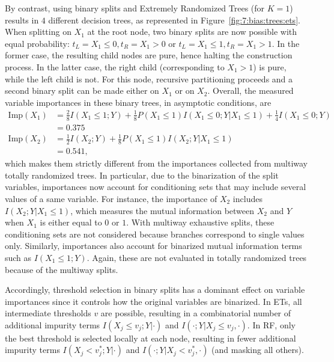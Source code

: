 By contrast, using binary splits and Extremely Randomized Trees (for $K=1$) results in $4$ different decision trees, as
represented in Figure~\ref{fig:7:bias:trees:ets}. When splitting on $X_1$ at
the root node, two binary splits are now possible with equal probability: $t_L = X_1 \leq 0, t_R = X_1 > 0$ or
$t_L = X_1 \leq 1, t_R = X_1 > 1$. In the former case, the resulting child nodes are pure,
hence halting the construction process. In the latter case, the right child
(corresponding to $X_1 > 1$) is pure, while the left child is not. For this
node, recursive partitioning proceeds and a second binary split can be made either on
$X_1$ or on $X_2$.  Overall, the measured variable
importances in these binary trees, in asymptotic conditions, are
\begin{align*}
\text{Imp}(X_1) &= \frac{2}{8} I(X_1 \leq 1;Y) + \frac{1}{8} P(X_1 \leq 1) I(X_1 \leq 0;Y|X_1 \leq 1) + \frac{1}{4} I(X_1 \leq 0;Y)\\
                &= 0.375 \\
\text{Imp}(X_2) &= \frac{1}{2} I(X_2;Y) + \frac{1}{8} P(X_1 \leq 1) I(X_2;Y|X_1\leq 1)\\
                &= 0.541,
\end{align*}
which makes them strictly different from the importances collected from multiway totally
randomized trees. In particular, due to the binarization of the split
variables, importances now account for conditioning sets that may include
several values of a same variable. For instance, the importance of $X_2$
includes $I(X_2;Y|X_1\leq 1)$, which measures the mutual information between
$X_2$ and $Y$ when $X_1$ is either equal to $0$ or $1$. With multiway
exhaustive splits, these conditioning sets are not considered because branches
correspond to single values only. Similarly, importances also account for
binarized mutual information terms such as $I(X_1 \leq 1;Y)$. Again, these are
not evaluated in totally randomized trees because of the multiway splits.

Accordingly, threshold selection in binary splits has a dominant effect on
variable importances since it controls how the original variables are
binarized. In ETs, all intermediate thresholds $v$ are possible, resulting in a
combinatorial number of additional impurity terms $I(X_j \leq v_j;Y|\cdot)$ and
$I(\cdot;Y|X_j \leq v_j, \cdot)$. In RF, only the best threshold is selected
locally at each node, resulting in fewer additional impurity terms $I(X_j <
v_j^*;Y|\cdot)$ and $I(\cdot;Y|X_j < v_j^*,\cdot)$ (and masking all others).

